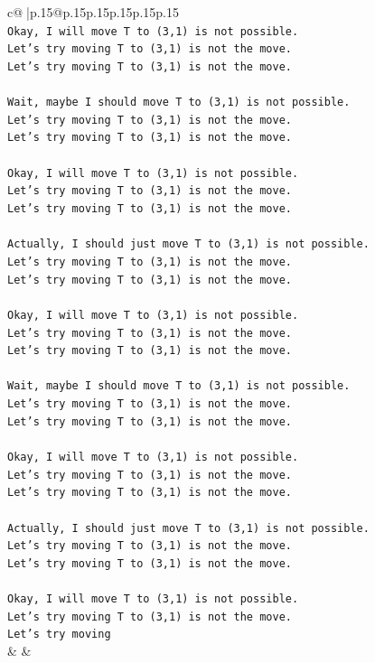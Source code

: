 \documentclass{article}
\begin{document}
{\begin{supertabular}{c@{$\;$}|p{.15\linewidth}@{}p{.15\linewidth}p{.15\linewidth}p{.15\linewidth}p{.15\linewidth}p{.15\linewidth}}
{{{\\ 
\texttt{Okay, I will move T to (3,1) is not possible.} \\
\texttt{Let's try moving T to (3,1) is not the move.} \\
\texttt{Let's try moving T to (3,1) is not the move.} \\
\\ 
\texttt{Wait, maybe I should move T to (3,1) is not possible.} \\
\texttt{Let's try moving T to (3,1) is not the move.} \\
\texttt{Let's try moving T to (3,1) is not the move.} \\
\\ 
\texttt{Okay, I will move T to (3,1) is not possible.} \\
\texttt{Let's try moving T to (3,1) is not the move.} \\
\texttt{Let's try moving T to (3,1) is not the move.} \\
\\ 
\texttt{Actually, I should just move T to (3,1) is not possible.} \\
\texttt{Let's try moving T to (3,1) is not the move.} \\
\texttt{Let's try moving T to (3,1) is not the move.} \\
\\ 
\texttt{Okay, I will move T to (3,1) is not possible.} \\
\texttt{Let's try moving T to (3,1) is not the move.} \\
\texttt{Let's try moving T to (3,1) is not the move.} \\
\\ 
\texttt{Wait, maybe I should move T to (3,1) is not possible.} \\
\texttt{Let's try moving T to (3,1) is not the move.} \\
\texttt{Let's try moving T to (3,1) is not the move.} \\
\\ 
\texttt{Okay, I will move T to (3,1) is not possible.} \\
\texttt{Let's try moving T to (3,1) is not the move.} \\
\texttt{Let's try moving T to (3,1) is not the move.} \\
\\ 
\texttt{Actually, I should just move T to (3,1) is not possible.} \\
\texttt{Let's try moving T to (3,1) is not the move.} \\
\texttt{Let's try moving T to (3,1) is not the move.} \\
\\ 
\texttt{Okay, I will move T to (3,1) is not possible.} \\
\texttt{Let's try moving T to (3,1) is not the move.} \\
\texttt{Let's try moving} \\
            }
        }
    }
    & & \\ \\


\end{supertabular}}
\end{document}

